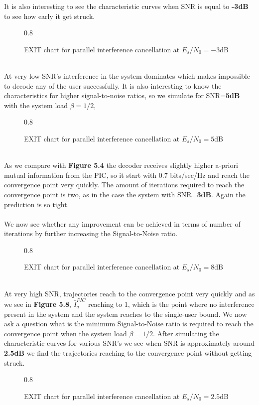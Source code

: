It is also interesting to see the characteristic curves when SNR is equal to \textbf{-3dB} to see how early it get struck.
\begin{figure*}[htb]
\centerline{  {0.8}}
\caption{EXIT chart for parallel interference cancellation at $E_s/N_0=-3$dB}
\end{figure*}\\
At very low SNR's interference in the system dominates which makes impossible to decode any of the user successfully.
\newpage
It is also interesting to know the characteristics for higher signal-to-noise ratios, so we simulate for SNR=\textbf{5dB} with the system load $\beta=1/2$,
\begin{figure*}[htb]
\centerline{  {0.8}}
\caption{EXIT chart for parallel interference cancellation at $E_s/N_0=5$dB}
\end{figure*}\\
As we compare with \textbf{Figure 5.4} the decoder receives slightly higher a-priori mutual information from the PIC, so it start with 0.7 bits/sec/Hz and reach the convergence point very quickly. The amount of iterations required to reach the convergence point is two, as in the case the system with SNR=\textbf{3dB}. Again the prediction is so tight. \\ \\
We now see whether any improvement can be achieved in terms of number of iterations by further increasing the Signal-to-Noise ratio.
\begin{figure*}[htb]
\centerline{  {0.8}}
\caption{EXIT chart for parallel interference cancellation at $E_s/N_0=8$dB}
\end{figure*}\\
At very high SNR, trajectories reach to the convergence point very quickly and as we see in \textbf{Figure 5.8}, $\bar{I}_a^{PIC}$ reaching to 1, which is the point where no interference present in the system and the system reaches to the single-user bound.
\newpage
We now ask a question what is the minimum Signal-to-Noise ratio is required to reach the convergence point when the system load $\beta=1/2$. After simulating the characteristic curves for various SNR's we see when SNR is approximately around \textbf{2.5dB} we find the trajectories reaching to the convergence point without getting struck.
\begin{figure*}[htb]
\centerline{  {0.8}}
\caption{EXIT chart for parallel interference cancellation at $E_s/N_0=2.5$dB}
\end{figure*}\\
